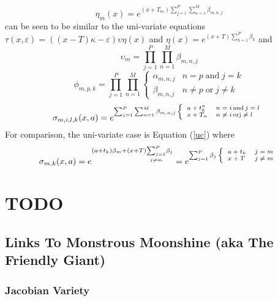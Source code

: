 \documentclass{amsart}
\newcommand{\tmop}[1]{\ensuremath{\operatorname{#1}}}
\newcommand{\tmscript}[1]{\text{\scriptsize{$#1$}}}
\begin{document}
\begin{equation}
  \eta_m ( x) = e^{( x + T_m) \sum_{j = 1}^P \sum_{n = 1}^M \beta_{m, n, j}}
\end{equation}
can be seen to be similar to the uni-variate equations $\tau ( x, \varepsilon)
= ( ( x - T) \kappa - \varepsilon) \upsilon \eta ( x)$ and $\eta ( x) = e^{( x
+ T) \sum_{k = 1}^P \beta_k}$ and
\begin{equation}
  \upsilon_m = \prod_{j = 1}^P \prod_{n = 1}^M \beta_{m, n, j}
\end{equation}
\begin{equation}
  \phi_{m, p, k} = \prod_{j = 1}^P \prod_{n = 1}^M \left\{ \begin{array}{ll}
    \alpha_{m, n, j} & n = p \tmop{and} j = k\\
    \beta_{m, n, j} & n \neq p \tmop{or} j \neq k
  \end{array} \right.
\end{equation}
\begin{equation}
  \sigma_{m, i, l, k} ( x, a) = e^{\tmscript{\sum_{j = 1}^P \sum_{n = 1}^M
  \beta_{m, n, j} \left\{ \begin{array}{ll}
    a + t^n_k & n = i \tmop{and} j = l\\
    x + T_n & n \neq i \tmop{orj} \neq l
  \end{array} \right.}}
\end{equation}
For comparison, the uni-variate case is Equation (\ref{uc}) where
\begin{equation}
  \sigma_{m, k} ( x, a) = e^{( a + t_k) \beta_m + ( x + T) \underset{j \neq
  m}{\sum_{j = 1}^P} \beta_j} = e^{\tmscript{\sum_{j = 1}^P \beta_j \left\{
  \begin{array}{ll}
    a + t_k & j = m\\
    x + T & j \neq m
  \end{array} \right.}}
\end{equation}

\section{TODO}

\subsection{Links To Monstrous Moonshine (aka The Friendly Giant)}

\subsubsection{Jacobian Variety}
\end{document}
